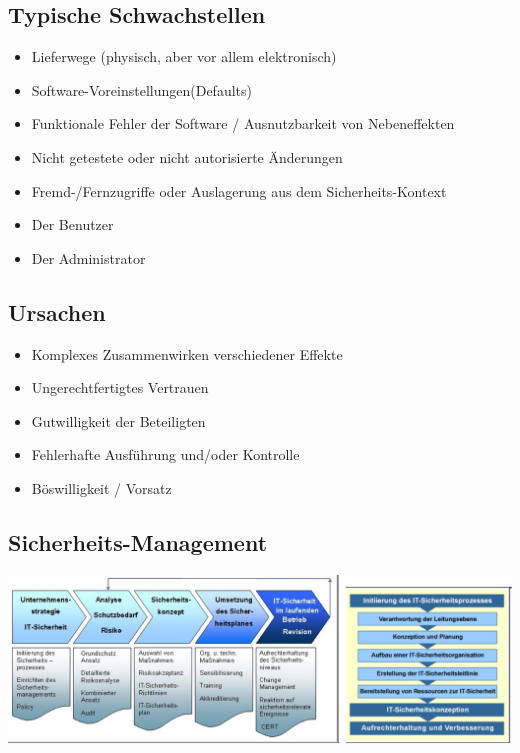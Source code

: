 \documentclass[a4paper, 10pt]{article}
\begin{document}
\subsection{Typische Schwachstellen}
\begin{itemize}
	\item Lieferwege (physisch, aber vor allem elektronisch)
	\item Software-Voreinstellungen(Defaults)
	\item Funktionale Fehler der Software / Ausnutzbarkeit von Nebeneffekten
	\item Nicht getestete oder nicht autorisierte Änderungen
	\item Fremd-/Fernzugriffe oder Auslagerung aus dem Sicherheits-Kontext
	\item Der Benutzer
	\item Der Administrator
\end{itemize}
\subsection{Ursachen}
\begin{itemize}
	\item Komplexes Zusammenwirken verschiedener Effekte
	\item Ungerechtfertigtes Vertrauen
	\item Gutwilligkeit der Beteiligten
	\item Fehlerhafte Ausführung und/oder Kontrolle
	\item Böswilligkeit / Vorsatz
\end{itemize}
\subsection{Sicherheits-Management}
\includegraphics[scale=0.35]{sicherheits_management.png}
\end{document}
